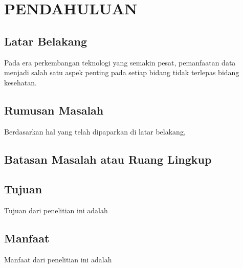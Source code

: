 \chapter{PENDAHULUAN}

\section{Latar Belakang}


Pada era perkembangan teknologi yang semakin pesat, pemanfaatan data menjadi salah satu aspek penting pada setiap bidang tidak terlepas bidang kesehatan.


\section{Rumusan Masalah}

Berdasarkan hal yang telah dipaparkan di latar belakang, \lipsum[4]

\section{Batasan Masalah atau Ruang Lingkup}

\lipsum[6]

\section{Tujuan}

Tujuan dari penelitian ini adalah \lipsum[7][1-14]

\section{Manfaat}

Manfaat dari penelitian ini adalah \lipsum[8][1-14]
